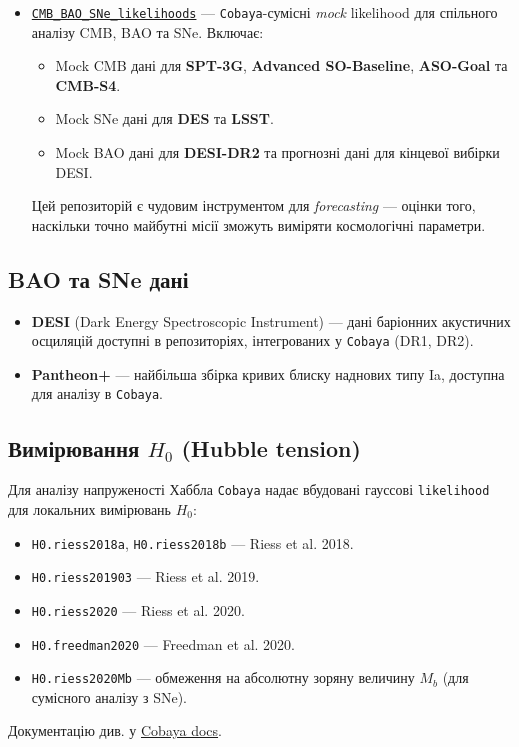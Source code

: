 \begin{itemize}
    \item \href{https://github.com/sriniraghunathan/CMB_BAO_SNe_likelihoods}{\texttt{CMB\_BAO\_SNe\_likelihoods}} ---
          \texttt{Cobaya}-сумісні \emph{mock} likelihood для спільного
          аналізу CMB, BAO та SNe. Включає:
          \begin{itemize}
              \item Mock CMB дані для \textbf{SPT-3G}, \textbf{Advanced SO-Baseline},
                    \textbf{ASO-Goal} та \textbf{CMB-S4}.
              \item Mock SNe дані для \textbf{DES} та \textbf{LSST}.
              \item Mock BAO дані для \textbf{DESI-DR2} та прогнозні дані для кінцевої вибірки DESI.
          \end{itemize}
          Цей репозиторій є чудовим інструментом для \emph{forecasting} ---
          оцінки того, наскільки точно майбутні місії зможуть виміряти
          космологічні параметри. \cite{raghunathan_2025}
\end{itemize}

\subsection*{BAO та SNe дані}

\begin{itemize}
    \item \textbf{DESI} (Dark Energy Spectroscopic Instrument) ---
          дані баріонних акустичних осциляцій доступні в репозиторіях,
          інтегрованих у \texttt{Cobaya} (DR1, DR2).

    \item \textbf{Pantheon+} --- найбільша збірка кривих блиску наднових
          типу Ia, доступна для аналізу в \texttt{Cobaya}.
\end{itemize}

\subsection*{Вимірювання $H_0$ (Hubble tension)}

Для аналізу напруженості Хаббла \texttt{Cobaya} надає вбудовані
гауссові \texttt{likelihood} для локальних вимірювань $H_0$:
\begin{itemize}
    \item \texttt{H0.riess2018a}, \texttt{H0.riess2018b} --- Riess et al. 2018.
    \item \texttt{H0.riess201903} --- Riess et al. 2019.
    \item \texttt{H0.riess2020} --- Riess et al. 2020.
    \item \texttt{H0.freedman2020} --- Freedman et al. 2020.
    \item \texttt{H0.riess2020Mb} --- обмеження на абсолютну зоряну
          величину $M_b$ (для сумісного аналізу з SNe).
\end{itemize}
Документацію див. у \href{https://cobaya.readthedocs.io/en/latest/likelihood_H0.html}{Cobaya docs}.

